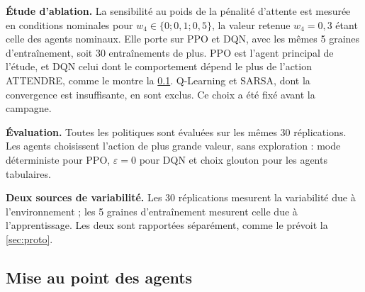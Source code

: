 \documentclass[11pt,a4paper]{article}
\newif\ifrevmarks
\newcommand{\revtag}[1]{\ifrevmarks\textsuperscript{\textcolor{red!70!black}{\scriptsize[#1]}}\fi}
\newenvironment{revbloc}[1]{\par\ifrevmarks\color{revcolor}\noindent\revtag{#1}\ \fi}{\par}
\begin{document}
\begin{revbloc}{M1, M7, m19, A, v3}
\textbf{Étude d'ablation.} La sensibilité au poids de la pénalité d'attente est mesurée en conditions nominales pour $w_4 \in \{0 ; 0{,}1 ; 0{,}5\}$, la valeur retenue $w_4 = 0{,}3$ étant celle des agents nominaux. Elle porte sur PPO et DQN, avec les mêmes 5 graines d'entraînement, soit 30 entraînements de plus. PPO est l'agent principal de l'étude, et DQN celui dont le comportement dépend le plus de l'action ATTENDRE, comme le montre la \cref{sec:tuning}. Q-Learning et SARSA, dont la convergence est insuffisante, en sont exclus. Ce choix a été fixé avant la campagne.

\textbf{Évaluation.} Toutes les politiques sont évaluées sur les mêmes 30 réplications. Les agents choisissent l'action de plus grande valeur, sans exploration : mode déterministe pour PPO, $\varepsilon = 0$ pour DQN et choix glouton pour les agents tabulaires.

\textbf{Deux sources de variabilité.} Les 30 réplications mesurent la variabilité due à l'environnement ; les 5 graines d'entraînement mesurent celle due à l'apprentissage. Les deux sont rapportées séparément, comme le prévoit la \cref{sec:proto}.
\end{revbloc}

\subsection{Mise au point des agents}
\label{sec:tuning}
\end{document}
